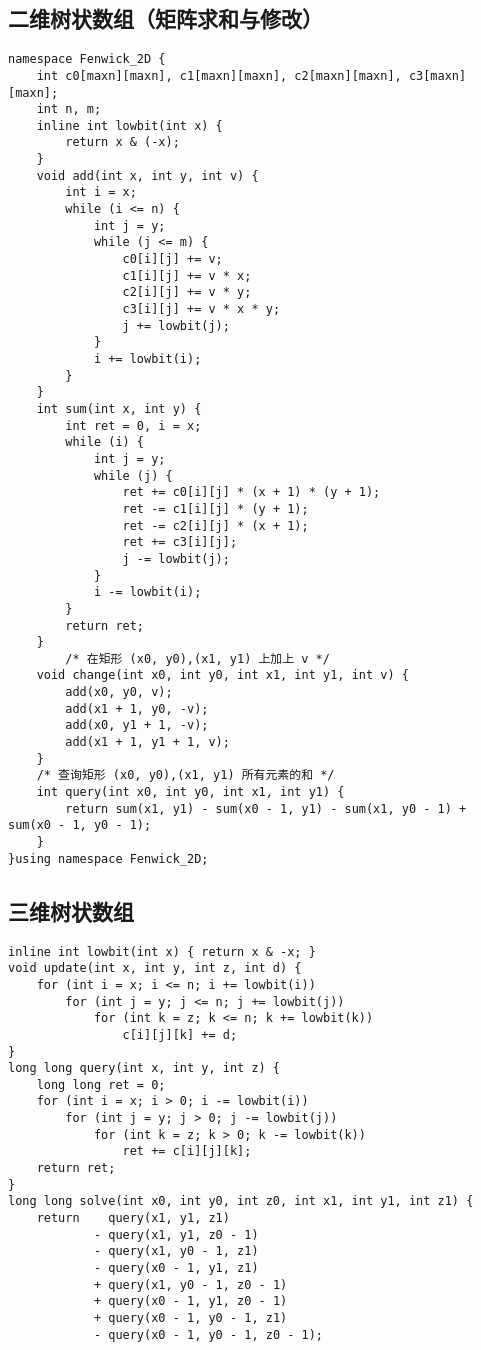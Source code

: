 \subsection{二维树状数组（矩阵求和与修改）}

\begin{verbatim}
namespace Fenwick_2D {
    int c0[maxn][maxn], c1[maxn][maxn], c2[maxn][maxn], c3[maxn][maxn];
    int n, m;
    inline int lowbit(int x) {
        return x & (-x);
    }
    void add(int x, int y, int v) {
        int i = x;
        while (i <= n) {
            int j = y;
            while (j <= m) {
                c0[i][j] += v;
                c1[i][j] += v * x;
                c2[i][j] += v * y;
                c3[i][j] += v * x * y;
                j += lowbit(j);
            }
            i += lowbit(i);
        }
    }
    int sum(int x, int y) {
        int ret = 0, i = x;
        while (i) {
            int j = y;
            while (j) {
                ret += c0[i][j] * (x + 1) * (y + 1);
                ret -= c1[i][j] * (y + 1);
                ret -= c2[i][j] * (x + 1);
                ret += c3[i][j];
                j -= lowbit(j);
            }
            i -= lowbit(i);
        }
        return ret;
    }
        /* 在矩形 (x0, y0),(x1, y1) 上加上 v */
    void change(int x0, int y0, int x1, int y1, int v) {
        add(x0, y0, v);
        add(x1 + 1, y0, -v);
        add(x0, y1 + 1, -v);
        add(x1 + 1, y1 + 1, v);
    }
    /* 查询矩形 (x0, y0),(x1, y1) 所有元素的和 */
    int query(int x0, int y0, int x1, int y1) {
        return sum(x1, y1) - sum(x0 - 1, y1) - sum(x1, y0 - 1) + sum(x0 - 1, y0 - 1);
    }
}using namespace Fenwick_2D;
\end{verbatim}
\subsection{三维树状数组}
\begin{verbatim}
inline int lowbit(int x) { return x & -x; }
void update(int x, int y, int z, int d) {
    for (int i = x; i <= n; i += lowbit(i))
        for (int j = y; j <= n; j += lowbit(j))
            for (int k = z; k <= n; k += lowbit(k))
                c[i][j][k] += d;
}
long long query(int x, int y, int z) {
    long long ret = 0;
    for (int i = x; i > 0; i -= lowbit(i))
        for (int j = y; j > 0; j -= lowbit(j))
            for (int k = z; k > 0; k -= lowbit(k))
                ret += c[i][j][k];
    return ret;
}
long long solve(int x0, int y0, int z0, int x1, int y1, int z1) {
    return    query(x1, y1, z1)
            - query(x1, y1, z0 - 1)
            - query(x1, y0 - 1, z1)
            - query(x0 - 1, y1, z1)
            + query(x1, y0 - 1, z0 - 1)
            + query(x0 - 1, y1, z0 - 1)
            + query(x0 - 1, y0 - 1, z1)
            - query(x0 - 1, y0 - 1, z0 - 1);
\end{verbatim}